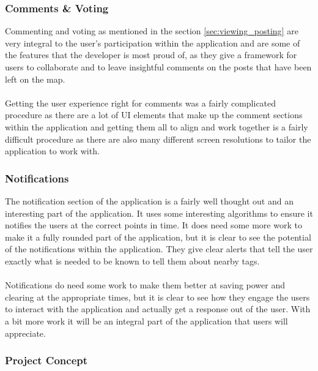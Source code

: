 \subsubsection{Comments \& Voting}

Commenting and voting as mentioned in the section \ref{sec:viewing_posting} are very integral to the user's participation within the application and are some of the features that the developer is most proud of, as they give a framework for users to collaborate and to leave insightful comments on the posts that have been left on the map.\\
\\
Getting the user experience right for comments was a fairly complicated procedure as there are a lot of UI elements that make up the comment sections within the application and getting them all to align and work together is a fairly difficult procedure as there are also many different screen resolutions to tailor the application to work with.

\subsubsection{Notifications}

The notification section of the application is a fairly well thought out and an interesting part of the application. It uses some interesting algorithms to ensure it notifies the users at the correct points in time. It does need some more work to make it a fully rounded part of the application, but it is clear to see the potential of the notifications within the application. They give clear alerts that tell the user exactly what is needed to be known to tell them about nearby tags.\\
\\
Notifications do need some work to make them better at saving power and clearing at the appropriate times, but it is clear to see how they engage the users to interact with the application and actually get a response out of the user. With a bit more work it will be an integral part of the application that users will appreciate.

\subsubsection{Project Concept}

